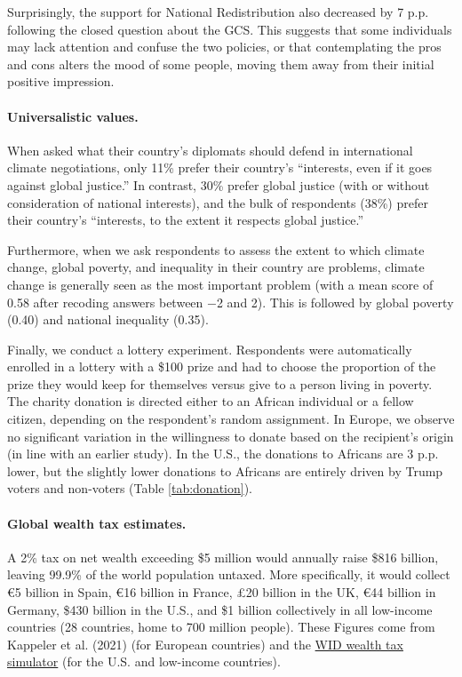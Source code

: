 \documentclass[12pt,english]{article}
\begin{document}
\begin{small}
Surprisingly, the support for National Redistribution also decreased by 7 p.p. following the closed question about the GCS. This suggests that some individuals may lack attention and confuse the two policies, or that contemplating the pros and cons alters the mood of some people, moving them away from their initial positive impression.

\paragraph{\small Universalistic values.}
When asked what their country's diplomats should defend in international climate negotiations, only 11\% prefer their country's ``interests, even if it goes against global justice.'' In contrast, 30\% prefer global justice (with or without consideration of national interests), and the bulk of respondents (38\%) prefer their country's ``interests, to the extent it respects global justice.''

Furthermore, when we ask respondents to assess the extent to which climate change, global poverty, and inequality in their country are problems, climate change is generally seen as the most important problem %
(with a mean score of 0.58 after recoding answers between $-$2 and 2). This is followed by global poverty (0.40) and national inequality (0.35). %

Finally, we conduct a lottery experiment. %
Respondents were automatically enrolled in a lottery with a \$100 prize and had to choose the proportion of the prize they would keep for themselves versus give to a person living in poverty. The %
charity donation is directed either to an African individual or a fellow citizen, depending on the respondent's random assignment. In Europe, we observe no significant variation in the willingness to donate based on the recipient's origin (in line with an earlier study\cite{cappelen_needs_2013}). In the U.S., the donations to Africans are 3 p.p. lower, %
but the slightly lower donations to Africans are entirely driven by Trump voters and non-voters (Table \ref{tab:donation}).

\paragraph{\small Global wealth tax estimates.}
A 2\% tax on net wealth exceeding \$5 million would annually raise \$816 billion, leaving 99.9\% of the world population untaxed. More specifically, it would collect \euro{}5 billion in Spain, \euro{}16 billion in France, £20 billion in the UK, \euro{}44 billion in Germany, \$430 billion in the U.S., and \$1 billion collectively in all low-income countries (28 countries, home to 700 million people). These Figures come from Kappeler et al. (2021)\cite{kapeller_european_2021} (for European countries) and the \href{https://wid.world/world-wealth-tax-simulator/}{WID wealth tax simulator} (for the U.S. and low-income countries).\cite{chancel_world_2022}

\end{small}
\end{document}
